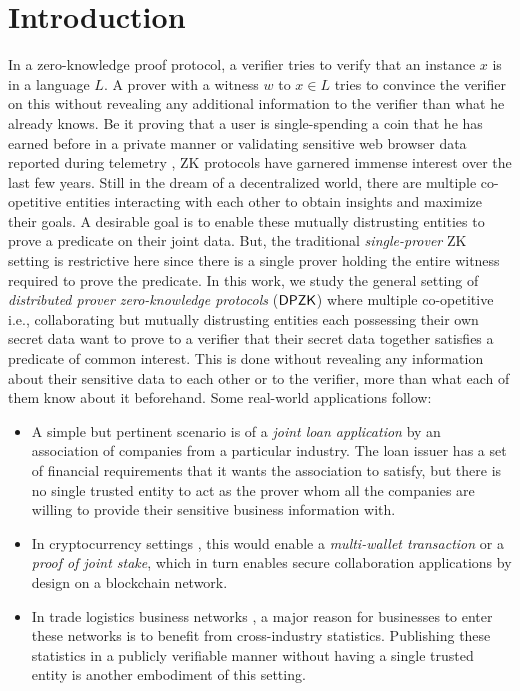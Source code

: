 \section{Introduction} \label{sec:intro}
In a zero-knowledge proof protocol, a verifier tries to verify that an instance $x$ is in a language $L$. A prover with a witness $w$ to $x \in L$ tries to convince the verifier on this without revealing any additional information to the verifier than what he already knows. Be it proving that a user is single-spending a coin that he has earned before in a private manner \cite{zerocash} or validating sensitive web browser data reported during telemetry \cite{MozillaPrio}, ZK protocols have garnered immense interest over the last few years. Still in the dream of a decentralized world, there are multiple co-opetitive entities interacting with each other to obtain insights and maximize their goals. A desirable goal is to enable these mutually distrusting entities to prove a predicate on their joint data. But, the traditional \textit{single-prover} ZK setting is restrictive here since there is a single prover holding the entire witness required to prove the predicate. 
In this work, we study the general setting of \textit{distributed prover zero-knowledge protocols} ($\mathsf{DPZK}$) where multiple co-opetitive i.e., collaborating but mutually distrusting entities each possessing their own secret data want to prove to a verifier that their secret data together satisfies a predicate of common interest. This is done without revealing any information about their sensitive data to each other or to the verifier, more than what each of them know about it beforehand. Some real-world applications follow:
\begin{itemize}
\item A simple but pertinent scenario is of a \textit{joint loan application} by an association of companies from a particular industry. The loan issuer has a set of financial requirements that it wants the association to satisfy, but there is no single trusted entity to act as the prover whom all the companies are willing to provide their sensitive business information with.
\item In cryptocurrency settings \cite{bitcoin, ethereum, zcash}, this would enable a \textit{multi-wallet transaction} or a \textit{proof of joint stake}, which in turn enables secure collaboration applications by design on a blockchain network. %
\item In trade logistics business networks \cite{scbn, e2open, tradelens}, a major reason for businesses to enter these networks is to benefit from cross-industry statistics. Publishing these statistics in a publicly verifiable manner without having a single trusted entity is another embodiment of this setting.
\end{itemize}

